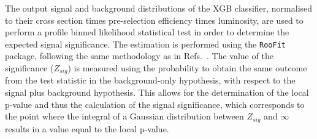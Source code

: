 The output signal and background distributions of the XGB classifier, normalised to their cross section times pre-selection efficiency times luminosity, are used to perform a profile binned likelihood statistical test in order to determine the expected signal significance. The estimation is performed using the \texttt{RooFit}~\cite{RooFit} package, following the same methodology as in Refs.~\cite{Barbosa:2022mmw, Florez:2021zoo, Florez:2019tqr, Florez:2018ojp, Florez:2017xhf, VBFZprimePaper, Florez:2016lwi, U1T3R, mSUGRApaper, SupercriticalString, ConnectingPPandCosmology, VBF1, DMmodels2, VBFSlepton, VBFStop, VBFSbottom}. The value of the significance ($Z_{sig}$) is measured using the probability to obtain the same outcome from the test statistic in the background-only hypothesis, with respect to the signal plus background hypothesis. This allows for the determination of the local p-value and thus the calculation of the signal significance, which corresponds to the point where the integral of a Gaussian distribution between $Z_{sig}$ and $\infty$ results in a value equal to the local p-value. 


